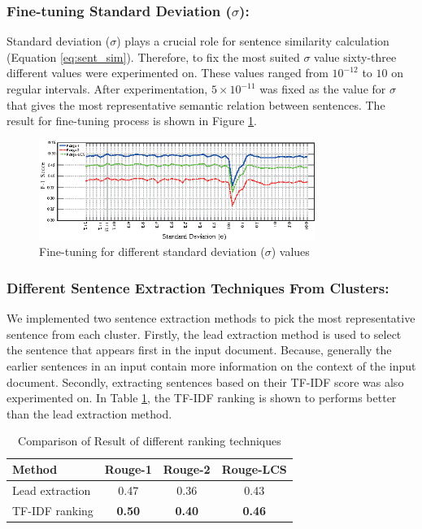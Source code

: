 \documentclass[acmlarge]{acmart}
\begin{document}
\subsubsection{Fine-tuning Standard Deviation ($\sigma$): }\label{subsubsec:sigma}
Standard deviation ($\sigma$) plays a crucial role for sentence similarity calculation (Equation \ref{eq:sent_sim}). Therefore, to fix the most suited $\sigma$ value sixty-three different values were experimented on. These values ranged from $10^{-12}$ to $10$ on regular intervals. After experimentation, $5\times10^{-11}$ was fixed as the value for $\sigma$ that gives the most representative semantic relation between sentences. The result for fine-tuning process is shown in Figure \ref{fig:sigma-fine-tuning}.
\begin{figure}[]
	\centering
	\includegraphics[width=0.8\textwidth]{figs/fine-tuning-edited}
	\caption{Fine-tuning for different standard deviation ($\sigma$) values}
	\label{fig:sigma-fine-tuning}
\end{figure}
\subsubsection{Different Sentence Extraction Techniques From Clusters: } \label{subsubsec:different-ranking-techniques-inside-clusters}
We implemented two sentence extraction methods to pick the most representative sentence from each cluster. Firstly, the lead extraction method is used to select the sentence that appears first in the input document. Because, generally the earlier sentences in an input contain more information on the context of the input document. Secondly, extracting sentences based on their TF-IDF score was also experimented on. In Table \ref{tab:ranking}, the TF-IDF ranking is shown to performs better than the lead extraction method.
\begin{table}[]
	\centering
	\begin{tabular}{lccc}\hline
		Method      	& Rouge-1       & Rouge-2       & Rouge-LCS     \\\hline
		Lead extraction	& 0.47          & 0.36          & 0.43          \\
		TF-IDF ranking	& \textbf{0.50} & \textbf{0.40} & \textbf{0.46} \\\hline
	\end{tabular}
	\caption{Comparison of Result of different ranking techniques}
	\label{tab:ranking}
\end{table}
\end{document}
